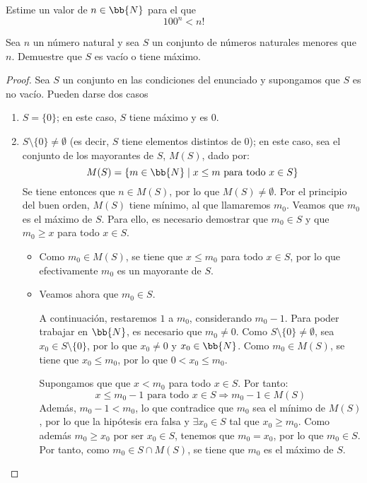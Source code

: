 \begin{ejercicio}
    Estime un valor de $n\in \bb{N}$ para el que
    $$100^n < n!$$
\end{ejercicio}

\begin{ejercicio}
Sea $n$ un número natural y sea $S$ un conjunto de números naturales menores que $n$. Demuestre que $S$ es vacío o tiene máximo.
\begin{proof}
Sea $S$ un conjunto en las condiciones del enunciado y supongamos que $S$ es no vacío. Pueden darse dos casos
\begin{enumerate}
    \item $S = \{0\}$; en este caso, $S$ tiene máximo y es $0$.
    \item $S\setminus\{0\} \neq \emptyset$ (es decir, $S$ tiene elementos distintos de $0$); en este caso, sea el conjunto de los mayorantes de $S$, $M(S)$, dado por:
    \begin{equation*}
        M(S) = \{ m \in \bb{N} \mid x \leq m \text{ para todo } x \in S\}
    \end{equation*}
    Se tiene entonces que $n\in M(S)$, por lo que $M(S)\neq \emptyset$. Por el principio del buen orden, $M(S)$ tiene mínimo, al que llamaremos $m_0$.
    Veamos que $m_0$ es el máximo de $S$. Para ello, es necesario demostrar que $m_0\in S$ y que $m_0\geq x$ para todo $x\in S$.
    \begin{itemize}
        \item Como $m_0\in M(S)$, se tiene que $x\leq m_0$ para todo $x\in S$, por lo que efectivamente $m_0$ es un mayorante de $S$.
        \item Veamos ahora que $m_0\in S$.
        \begin{observacion}
            A continuación, restaremos $1$ a $m_0$, considerando $m_0-1$.
            Para poder trabajar en $\bb{N}$, es necesario que $m_0\neq 0$.
            Como $S\setminus \{0\}\neq \emptyset$, sea $x_0\in S\setminus \{0\}$, por lo que $x_0\neq 0$ y $x_0\in \bb{N}$.
            Como $m_0\in M(S)$, se tiene que $x_0\leq m_0$, por lo que $0<x_0\leq m_0$.
        \end{observacion}
        
        
        Supongamos que que $x<m_0$ para todo $x\in S$.
        Por tanto:
        \begin{equation*}
            x\leq m_0 - 1 \text{ para todo } x\in S \Longrightarrow m_0 - 1 \in M(S)
        \end{equation*}
        Además, $m_0 - 1 < m_0$, lo que contradice que $m_0$ sea el mínimo de $M(S)$, por lo que la hipótesis era falsa y $\exists x_0\in S$ tal que $x_0\geq m_0$.
        Como además $m_0\geq x_0$ por ser $x_0\in S$, tenemos que $m_0 = x_0$, por lo que $m_0\in S$.
        Por tanto, como $m_0\in S\cap M(S)$, se tiene que $m_0$ es el máximo de $S$.\qedhere
    \end{itemize}
\end{enumerate}
\end{proof}
\end{ejercicio}

